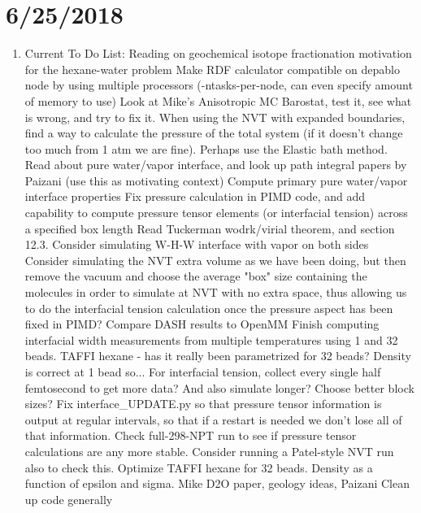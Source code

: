 \documentclass[12pt,reqno]{amsart}
\numberwithin{equation}{section}
\begin{document}
\section{6/25/2018}
\begin{enumerate}
\item Current To Do List:
\subitem Reading on geochemical isotope fractionation motivation for the hexane-water problem
\subitem Make RDF calculator compatible on depablo node by using multiple processors (-ntasks-per-node, can even specify amount of memory to use)
\subitem Look at Mike's Anisotropic MC Barostat, test it, see what is wrong, and try to fix it.  
\subitem When using the NVT with expanded boundaries, find a way to calculate the pressure of the total system (if it doesn't change too much from 1 atm we are fine).  Perhaps use the Elastic bath method.  
\subitem Read about pure water/vapor interface, and look up path integral papers by Paizani (use this as motivating context)
\subitem Compute primary pure water/vapor interface properties 
\subitem Fix pressure calculation in PIMD code, and add capability to compute pressure tensor elements (or interfacial tension) across a specified box length 
\subitem Read Tuckerman wodrk/virial theorem, and section 12.3.  
\subitem Consider simulating W-H-W interface with vapor on both sides
\subitem Consider simulating the NVT extra volume as we have been doing, but then remove the vacuum and choose the average "box" size containing the molecules in order to simulate at NVT with no extra space, thus allowing us to do the interfacial tension calculation once the pressure aspect has been fixed in PIMD? 
\subitem Compare DASH results to OpenMM
\subitem Finish computing interfacial width measurements from multiple temperatures using 1 and 32 beads. 
\subitem TAFFI hexane - has it really been parametrized for 32 beads?  Density is correct at 1 bead so... 
\subitem For interfacial tension, collect every single half femtosecond to get more data?  And also simulate longer?  Choose better block sizes?
\subitem Fix interface\_UPDATE.py so that pressure tensor information is output at regular intervals, so that if a restart is needed we don't lose all of that information.  
\subitem Check full-298-NPT run to see if pressure tensor calculations are any more stable.  Consider running a Patel-style NVT run also to check this.  
\subitem Optimize TAFFI hexane for 32 beads.  Density as a function of epsilon and sigma.  
\subitem Mike D2O paper, geology ideas, Paizani
\subitem Clean up code generally 


\end{enumerate}
\end{document}
